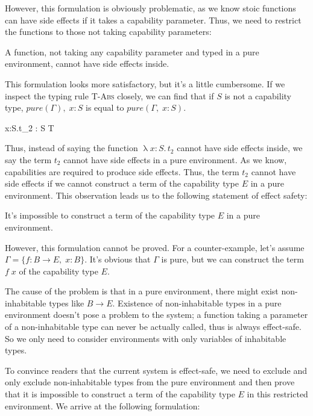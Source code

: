 However, this formulation is obviously problematic, as we know stoic
functions can have side effects if it takes a capability
parameter. Thus, we need to restrict the functions to those not taking
capability parameters:

\begin{definition}
  A function, not taking any capability parameter and typed in a pure
  environment, cannot have side effects inside.
\end{definition}

This formulation looks more satisfactory, but it's a little
cumbersome. If we inspect the typing rule \textsc{T-Abs} closely, we
can find that if $S$ is not a capability type, $pure(\Gamma),\; x: S$
is equal to $pure(\Gamma,\; x: S)$.

{ \Gamma \vdash \uplambda x{:}S.\;t_2 : S \to T }

Thus, instead of saying the function $\uplambda x{:}S.\, t_2$ cannot
have side effects inside, we say the term $t_2$ cannot have side
effects in a pure environment. As we know, capabilities are required
to produce side effects. Thus, the term $t_2$ cannot have side effects
if we cannot construct a term of the capability type $E$ in a pure
environment. This observation leads us to the following statement of
effect safety:

\begin{definition}
  It's impossible to construct a term of the capability type $E$ in a
  pure environment.
\end{definition}

However, this formulation cannot be proved.  For a counter-example,
let's assume $\Gamma = \{f: B \to E, \; x: B\}$. It's obvious that
$\Gamma$ is pure, but we can construct the term $f \; x$ of the
capability type $E$.

The cause of the problem is that in a pure environment, there might
exist non-inhabitable types like $B \to E$.  Existence of
non-inhabitable types in a pure environment doesn't pose a problem to
the system; a function taking a parameter of a non-inhabitable type
can never be actually called, thus is always effect-safe. So we only
need to consider environments with only variables of inhabitable
types.

To convince readers that the current system is effect-safe, we need to
exclude and only exclude non-inhabitable types from the pure
environment and then prove that it is impossible to construct a term
of the capability type $E$ in this restricted environment. We arrive
at the following formulation:


